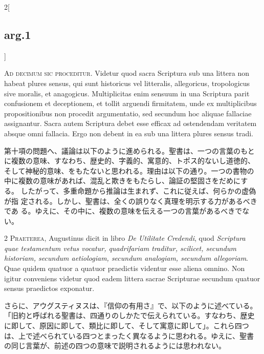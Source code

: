 \documentclass[
paper=a4paper,
fontsize=10pt,
jafontsize=9pt,
titlepage
]{jlreq}
\begin{document}
\begin{paracol}{2}[\subsection{arg.1}]

{\Huge A}{\scshape d decimum sic proceditur}. Videtur quod sacra
Scriptura sub una littera non habeat plures sensus, qui sunt
historicus vel litteralis, allegoricus, tropologicus sive moralis, et
anagogicus. Multiplicitas enim sensuum in una Scriptura parit
confusionem et deceptionem, et tollit arguendi firmitatem, unde ex
multiplicibus propositionibus non procedit argumentatio, sed secundum
hoc aliquae fallaciae assignantur. Sacra autem Scriptura debet esse
efficax ad ostendendam veritatem absque omni fallacia. Ergo non debent
in ea sub una littera plures sensus tradi.

\switchcolumn

第十項の問題へ、議論は以下のように進められる。聖書は、一つの言葉のもと
に複数の意味、すなわち、歴史的、字義的、寓意的、トポス的ないし道徳的、
そして神秘的意味、をもたないと思われる。理由は以下の通り。一つの書物の
中に複数の意味があれば、混乱と欺きをもたらし、論証の堅固さをだめにする。
したがって、多重命題から推論は生まれず、これに従えば、何らかの虚偽が指
定される。しかし、聖書は、全くの誤りなく真理を明示する力があるべきであ
る。ゆえに、その中に、複数の意味を伝える一つの言葉があるべきでない。


{\scshape 2 Praeterea}, Augustinus dicit in libro {\itshape De
Utilitate Credendi}, quod {\itshape Scriptura quae testamentum vetus
vocatur, quadrifariam traditur, scilicet, secundum historiam, secundum
aetiologiam, secundum analogiam, secundum allegoriam}. Quae quidem
quatuor a quatuor praedictis videntur esse aliena omnino. Non igitur
conveniens videtur quod eadem littera sacrae Scripturae secundum
quatuor sensus praedictos exponatur.

\switchcolumn

さらに、アウグスティヌスは、『信仰の有用さ』で、以下のように述べている。
「旧約と呼ばれる聖書は、四通りのしかたで伝えられている。すなわち、歴史
に即して、原因に即して、類比に即して、そして寓意に即して」。これら四つ
は、上で述べられている四つとまったく異なるように思われる。ゆえに、聖書
の同じ言葉が、前述の四つの意味で説明されるようには思われない。


\end{paracol}
\end{document}
